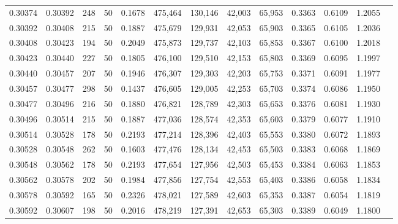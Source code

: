\begin{tabular}{rrrrrrrrrrrrr}
0.30374 & 0.30392 &   248 &  50 &                                     0.1678 & 475,464 & 130,146 &  42,003 &  65,953 & 0.3363 & 0.6109 & 1.2055 \\
0.30392 & 0.30408 &   215 &  50 &                                     0.1887 & 475,679 & 129,931 &  42,053 &  65,903 & 0.3365 & 0.6105 & 1.2036 \\
0.30408 & 0.30423 &   194 &  50 &                                     0.2049 & 475,873 & 129,737 &  42,103 &  65,853 & 0.3367 & 0.6100 & 1.2018 \\
0.30423 & 0.30440 &   227 &  50 &                                     0.1805 & 476,100 & 129,510 &  42,153 &  65,803 & 0.3369 & 0.6095 & 1.1997 \\
0.30440 & 0.30457 &   207 &  50 &                                     0.1946 & 476,307 & 129,303 &  42,203 &  65,753 & 0.3371 & 0.6091 & 1.1977 \\
0.30457 & 0.30477 &   298 &  50 &                                     0.1437 & 476,605 & 129,005 &  42,253 &  65,703 & 0.3374 & 0.6086 & 1.1950 \\
0.30477 & 0.30496 &   216 &  50 &                                     0.1880 & 476,821 & 128,789 &  42,303 &  65,653 & 0.3376 & 0.6081 & 1.1930 \\
0.30496 & 0.30514 &   215 &  50 &                                     0.1887 & 477,036 & 128,574 &  42,353 &  65,603 & 0.3379 & 0.6077 & 1.1910 \\
0.30514 & 0.30528 &   178 &  50 &                                     0.2193 & 477,214 & 128,396 &  42,403 &  65,553 & 0.3380 & 0.6072 & 1.1893 \\
0.30528 & 0.30548 &   262 &  50 &                                     0.1603 & 477,476 & 128,134 &  42,453 &  65,503 & 0.3383 & 0.6068 & 1.1869 \\
0.30548 & 0.30562 &   178 &  50 &                                     0.2193 & 477,654 & 127,956 &  42,503 &  65,453 & 0.3384 & 0.6063 & 1.1853 \\
0.30562 & 0.30578 &   202 &  50 &                                     0.1984 & 477,856 & 127,754 &  42,553 &  65,403 & 0.3386 & 0.6058 & 1.1834 \\
0.30578 & 0.30592 &   165 &  50 &                                     0.2326 & 478,021 & 127,589 &  42,603 &  65,353 & 0.3387 & 0.6054 & 1.1819 \\
0.30592 & 0.30607 &   198 &  50 &                                     0.2016 & 478,219 & 127,391 &  42,653 &  65,303 & 0.3389 & 0.6049 & 1.1800 \\

\end{tabular}
